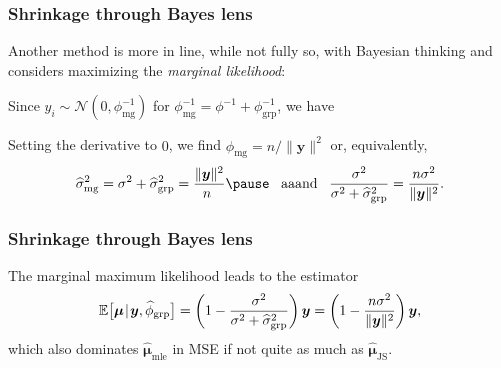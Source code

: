 \documentclass[18pt]{beamer}
\newcommand{\defineTightSpacing}{%
	\setlength{\abovedisplayskip}{.25\baselineskip}%
	\setlength{\belowdisplayskip}{.25\baselineskip}%
}
\newenvironment{tightEquation*}{%
	\defineTightSpacing%
	\begin{equation*}
}{
	\end{equation*} \ignorespacesafterend
}
\newcommand{\given}{\thinnerspace | \thinnerspace}
\newcommand{\diff}{\operatorname{\mathrm{d}}\!{}}
\newcommand{\thinnerspace}{\mskip.5\thinmuskip}
\newcommand{\expectation}{\mathbb{E}}
\newcommand{\normalDist}{\mathcal{N}}
\newcommand{\mle}[1]{\widehat{#1}_{\textrm{mle}}}
\newcommand{\density}{\operatorname{\pi}}
\newcommand{\likelihood}{L}
\newcommand{\by}{\bm{y}}
\newcommand{\bmu}{\bm{\mu}}
\begin{document}
\begin{frame}
\frametitle{Shrinkage through Bayes lens}
Another method is more in line, while not fully so, with Bayesian thinking and considers maximizing the \textit{marginal likelihood}:

\pause
Since $y_i \sim \normalDist(0, \phi_{\mathrm{mg}}^{-1})$ for $\phi_{\mathrm{mg}}^{-1} = \phi^{-1} + \phi_{\mathrm{grp}}^{-1}$, we have
\begin{tightEquation*}
\end{tightEquation*}

\pause
\smallskip
Setting the derivative to $0$, we find $\widehat{\phi}_{\mathrm{mg}} = n / \| \by \|^2$ or, equivalently,
\begin{equation*} \defineTightSpacing%
\widehat{\sigma}_{\mathrm{mg}}^2 
	= \sigma^2 + \widehat{\sigma}_{\mathrm{grp}}^2
	= \frac{\| \by \|^2}{\!\!n} 
	\pause
	\ \, \text{ aaand } \ \,
\frac{\sigma^2}{\sigma^2 + \widehat{\sigma}_{\mathrm{grp}}^2}
	= \frac{n \sigma^2}{\| \by \|^2}.
\end{equation*}
\end{frame}


\begin{frame}
\frametitle{Shrinkage through Bayes lens}
\vspace{1.5\baselineskip}
The marginal maximum likelihood leads to the estimator
\begin{equation*} \defineTightSpacing%
\expectation\big[
	\bmu \given \by, \widehat{\phi}_{\mathrm{grp}}
\big]
	= \left( 1 - \frac{\sigma^2}{\sigma^2 + \widehat{\sigma}^2_{\mathrm{grp}}} \right) \by
	= \left( 1 - \frac{n \sigma^2}{\| \by \|^2} \right) \by,
\end{equation*}
which also dominates $\mle{\bmu}$ in {\small MSE} if not quite as much as $\widehat{\bmu}_{\mathrm{JS}}$.
\end{frame}
\end{document}
